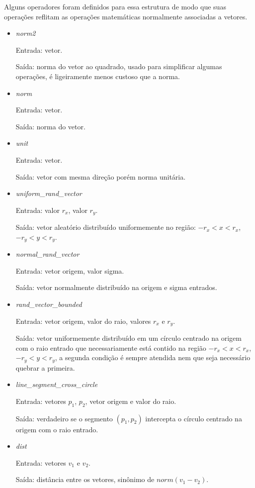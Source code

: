 Alguns operadores foram definidos para essa estrutura de modo que suas operações
reflitam as operações matemáticas normalmente associadas a vetores.

\begin{itemize}
  \item \textit{norm2}
    \par Entrada: vetor.
    \par Saída: norma do vetor ao quadrado, usado para simplificar algumas
    operações, é ligeiramente menos custoso que a norma.
  \item \textit{norm}
    \par Entrada: vetor.
    \par Saída: norma do vetor.
  \item \textit{unit}
    \par Entrada: vetor.
    \par Saída: vetor com mesma direção porém norma unitária.
  \item \textit{uniform_rand_vector}
    \par Entrada: valor $r_x$, valor $r_y$.
    \par Saída: vetor aleatório distribuído uniformemente no região:
    $-r_x < x < r_x$, $-r_y < y < r_y$.
  \item \textit{normal_rand_vector}
    \par Entrada: vetor origem, valor sigma.
    \par Saída: vetor normalmente distribuído na origem e sigma entrados.
  \item \textit{rand_vector_bounded}
    \par Entrada: vetor origem, valor do raio, valores $r_x$ e $r_y$.
    \par Saída: vetor uniformemente distribuído em um círculo centrado na origem
    com o raio entrado que necessariamente está contido na região
    $-r_x < x < r_x$, $-r_y < y < r_y$, a segunda condição é sempre atendida nem
    que seja necessário quebrar a primeira.
  \item \textit{line_segment_cross_circle}
    \par Entrada: vetores $p_1$, $p_2$, vetor origem e valor do raio.
    \par Saída: verdadeiro se o segmento $(p_1, p_2)$ intercepta o círculo
    centrado na origem com o raio entrado.
  \item \textit{dist}
    \par Entrada: vetores $v_1$ e $v_2$.
    \par Saída: distância entre os vetores, sinônimo de $norm(v_1 - v_2)$.
\end{itemize}

